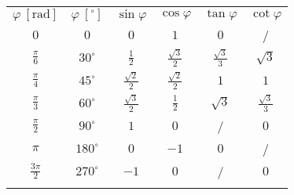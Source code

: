                \begin{table}[H]
                    \centering
                    \large
                    \addtolength{\tabcolsep}{6pt}
                    \renewcommand{\arraystretch}{1.5}                
                    \begin{tabular}{||c|c||c|c|c|c||} 
                        \hhline{|t:==:t:====:t|}
                        \rowcolor[rgb]{0.863,0.745,0.745}  
                                $\varphi~\left[\textrm{rad}\right] $ & $\varphi~\left[^\circ\right] $ & $\sin\varphi$ & $\cos\varphi$ & $\tan\varphi$ & $\cot\varphi$  \\ 
                        \hhline{|:==::====:|}
                                $0$ & $0$  & $0$ & $1$ & $0$ & /  \\ 
                        \hline
                                $\frac{\pi}{6}$ & $30^\circ$ & $\frac{1}{2}$ & $\frac{\sqrt{3}}{2}$ & $\frac{\sqrt{3}}{3}$ & $\sqrt{3}$  \\ 
                        \hline
                                $\frac{\pi}{4}$ & $45^\circ$ & $\frac{\sqrt{2}}{2}$ & $\frac{\sqrt{2}}{2}$ & $1$ & $1$  \\ 
                        \hline
                                $\frac{\pi}{3}$ & $60^\circ$ & $\frac{\sqrt{3}}{2}$ & $\frac{1}{2}$ & $\sqrt{3}$ & $\frac{\sqrt{3}}{3}$  \\ 
                        \hline
                                $\frac{\pi}{2}$ & $90^\circ$ & $1$ & $0$ & / & $0$  \\  
                        \hline
                                $\pi$ & $180^\circ$ & $0$ & $-1$ & $0$ & /  \\ 
                        \hline
                                $\frac{3\pi}{2}$ & $270^\circ$ & $-1$ & $0$ & / & $0$  \\ 
                        \hhline{|b:==:b:====:b|}
                    \end{tabular}
                \end{table}
            

        
~\\~\\



